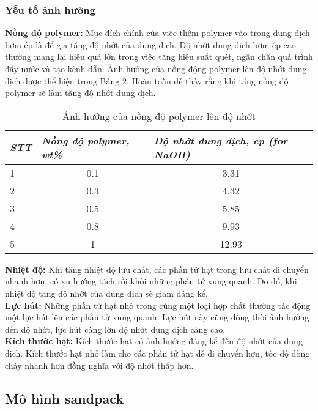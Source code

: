 \documentclass[12pt,a4paper]{article}
\begin{document}
	\subsubsection{Yếu tố ảnh hưởng}
	\textbf{Nồng độ polymer:} Mục đích chính của việc thêm polymer vào trong dung dịch bơm ép là để gia tăng độ nhớt của dung dịch. Độ nhớt dung dịch bơm ép cao thường mang lại hiệu quả lớn trong việc tăng hiệu suất quét, ngăn chặn quá trình đẩy nước và tạo kênh dẫn. Ảnh hưởng của nồng động polymer lên độ nhớt dung dịch được thể hiện trong Bảng 2. Hoàn toàn dễ thấy rằng khi tăng nồng độ polymer sẽ làm tăng độ nhớt dung dịch.
	
	\begin{table}[h]
	\centering
	\caption{Ảnh hưởng của nồng độ polymer lên độ nhớt \cite{nguyen2015effective}}
	\label{my-label}
	\begin{tabular}{@{}lcc@{}}
	\toprule
	\textit{STT} & \multicolumn{1}{l}{\textit{Nồng độ polymer, wt\%}} & \multicolumn{1}{l}{\textit{Độ nhớt dung dịch, cp (for NaOH)}} \\ \midrule
	1 & 0.1 & 3.31 \\
	2 & 0.3 & 4.32 \\
	3 & 0.5 & 5.85 \\
	4 & 0.8 & 9.93 \\
	5 & 1 & 12.93 \\ \bottomrule
	\end{tabular}
	\end{table}

	\noindent
	\textbf{Nhiệt độ:} Khi tăng nhiệt độ lưu chất, các phần tử hạt trong lưu chất di chuyển nhanh hơn, có xu hướng tách rồi khỏi những phần tử xung quanh. Do đó, khi nhiệt độ tăng độ nhớt của dung dịch sẽ giảm đáng kể.\\
	\textbf{Lực hút:} Những phần tử hạt nhỏ trong cùng một loại hợp chất thường tác động một lực hút lên các phần tử xung quanh. Lực hút này cũng đồng thời ảnh hưởng đến độ nhớt, lực hút càng lớn độ nhớt dung dịch càng cao.\\
	\textbf{Kích thước hạt:} Kích thước hạt có ảnh hưởng đáng kể đến độ nhớt của dung dịch. Kích thước hạt nhỏ làm cho các phần tử hạt dễ di chuyển hơn, tốc độ dòng chảy nhanh hơn đồng nghĩa với độ nhớt thấp hơn.\\

	\subsection{Mô hình sandpack}
\end{document}
